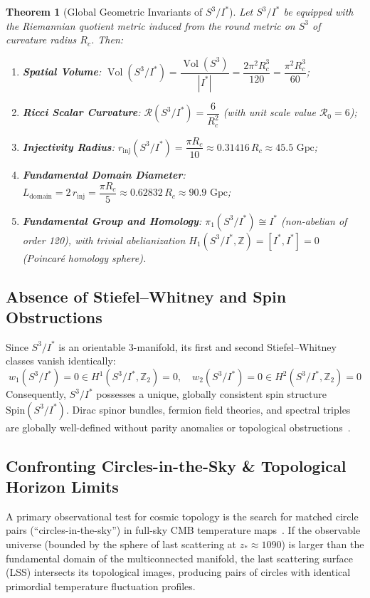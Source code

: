 \documentclass[11pt,a4paper]{article}
\newtheorem{theorem}{Theorem}[section]
\theoremstyle{definition}
\newcommand{\Spin}{\mathrm{Spin}}
\newcommand{\Vol}{\operatorname{Vol}}
\begin{document}
\begin{theorem}[Global Geometric Invariants of $S^3 / I^*$]
Let $S^3 / I^*$ be equipped with the Riemannian quotient metric induced from the round metric on $S^3$ of curvature radius $R_c$. Then:
\begin{enumerate}
    \item \textbf{Spatial Volume}: $\Vol(S^3 / I^*) = \dfrac{\Vol(S^3)}{|I^*|} = \dfrac{2\pi^2 R_c^3}{120} = \dfrac{\pi^2 R_c^3}{60}$;
    \item \textbf{Ricci Scalar Curvature}: $\mathcal{R}(S^3 / I^*) = \dfrac{6}{R_c^2}$ (with unit scale value $\mathcal{R}_0 = 6$);
    \item \textbf{Injectivity Radius}: $r_{\mathrm{inj}}(S^3 / I^*) = \dfrac{\pi R_c}{10} \approx 0.31416\,R_c \approx 45.5\text{ Gpc}$;
    \item \textbf{Fundamental Domain Diameter}: $L_{\mathrm{domain}} = 2\,r_{\mathrm{inj}} = \dfrac{\pi R_c}{5} \approx 0.62832\,R_c \approx 90.9\text{ Gpc}$;
    \item \textbf{Fundamental Group and Homology}: $\pi_1(S^3 / I^*) \cong I^*$ (non-abelian of order 120), with trivial abelianization $H_1(S^3 / I^*, \mathbb{Z}) = [I^*, I^*] = 0$ (Poincar\'e homology sphere).
\end{enumerate}
\end{theorem}

\subsection{Absence of Stiefel--Whitney and Spin Obstructions}
Since $S^3 / I^*$ is an orientable 3-manifold, its first and second Stiefel--Whitney classes vanish identically:
\begin{equation}
w_1(S^3 / I^*) = 0 \in H^1(S^3 / I^*, \mathbb{Z}_2) = 0, \quad w_2(S^3 / I^*) = 0 \in H^2(S^3 / I^*, \mathbb{Z}_2) = 0
\end{equation}
Consequently, $S^3 / I^*$ possesses a unique, globally consistent spin structure $\Spin(S^3 / I^*)$. Dirac spinor bundles, fermion field theories, and spectral triples are globally well-defined without parity anomalies or topological obstructions~\cite{vanSuijlekom2015,LawsonMichelsohn1989}.

\subsection{Confronting Circles-in-the-Sky \& Topological Horizon Limits}

A primary observational test for cosmic topology is the search for matched circle pairs (``circles-in-the-sky'') in full-sky CMB temperature maps~\cite{Cornish2004,Planck2015Topology}. If the observable universe (bounded by the sphere of last scattering at $z_* \approx 1090$) is larger than the fundamental domain of the multiconnected manifold, the last scattering surface (LSS) intersects its topological images, producing pairs of circles with identical primordial temperature fluctuation profiles.
\end{document}
